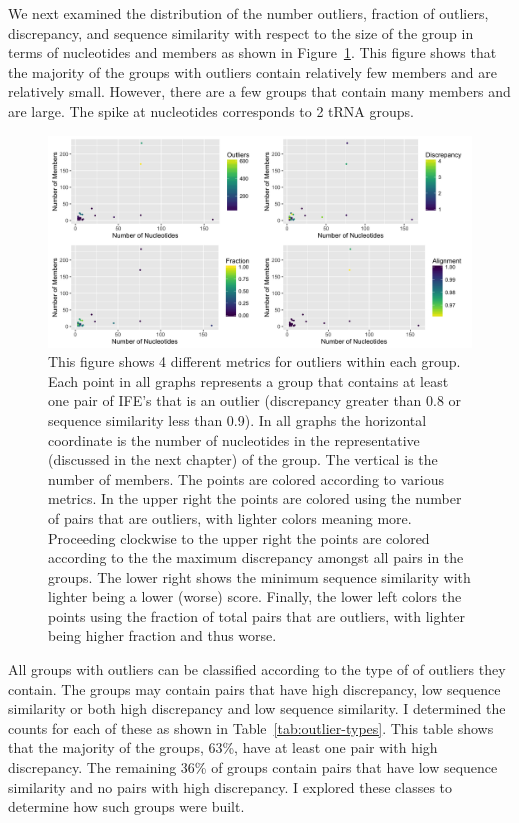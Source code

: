 We next examined the distribution of the number outliers, fraction of outliers,
discrepancy, and sequence similarity with respect to the size of the group in
terms of nucleotides and members as shown in Figure~\ref{fig:outlier-detail}.
This figure shows that the majority of the groups with outliers contain
relatively few members and are relatively small. However, there are a few groups
that contain many members and are large. The spike at 
nucleotides corresponds to 2 tRNA groups.

\begin{figure}[h]
  \includegraphics[width=\textwidth]{chapter-3/figs/outlier-details}
  \caption{This figure shows 4 different metrics for outliers within each group.
    Each point in all graphs represents a group that contains at least one pair
    of IFE’s that is an outlier (discrepancy greater than 0.8 or sequence
    similarity less than 0.9). In all graphs the horizontal coordinate is the
    number of nucleotides in the representative (discussed in the next chapter)
    of the group. The vertical is the number of members. The points are colored
    according to various metrics. In the upper right the points are colored
    using the number of pairs that are outliers, with lighter colors meaning
    more. Proceeding clockwise to the upper right the points are colored
    according to the the maximum discrepancy amongst all pairs in the groups.
    The lower right shows the minimum sequence similarity with lighter being a
    lower (worse) score. Finally, the lower left colors the points using the
    fraction of total pairs that are outliers, with lighter being higher
  fraction and thus worse.}
  \label{fig:outlier-detail}
\end{figure}

All groups with outliers can be classified according to the type of of outliers
they contain. The groups may contain pairs that have high discrepancy, low
sequence similarity or both high discrepancy and low sequence similarity. I
determined the counts for each of these as shown in
Table~\ref{tab:outlier-types}. This table shows that the majority of the groups,
63\%, have at least one pair with high discrepancy. The remaining 36\% of groups
contain pairs that have low sequence similarity and no pairs with high
discrepancy. I explored these classes to determine how such groups were built.

